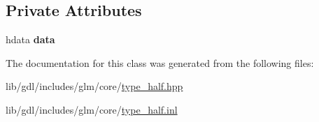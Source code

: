 \subsection*{Private Attributes}
\begin{DoxyCompactItemize}
\item 
\hypertarget{classglm_1_1detail_1_1half_a3db6f6f40b9359170e7922601cbd4e64}{}hdata {\bfseries data}\label{classglm_1_1detail_1_1half_a3db6f6f40b9359170e7922601cbd4e64}

\end{DoxyCompactItemize}


The documentation for this class was generated from the following files\+:\begin{DoxyCompactItemize}
\item 
lib/gdl/includes/glm/core/\hyperlink{type__half_8hpp}{type\+\_\+half.\+hpp}\item 
lib/gdl/includes/glm/core/\hyperlink{type__half_8inl}{type\+\_\+half.\+inl}\end{DoxyCompactItemize}

